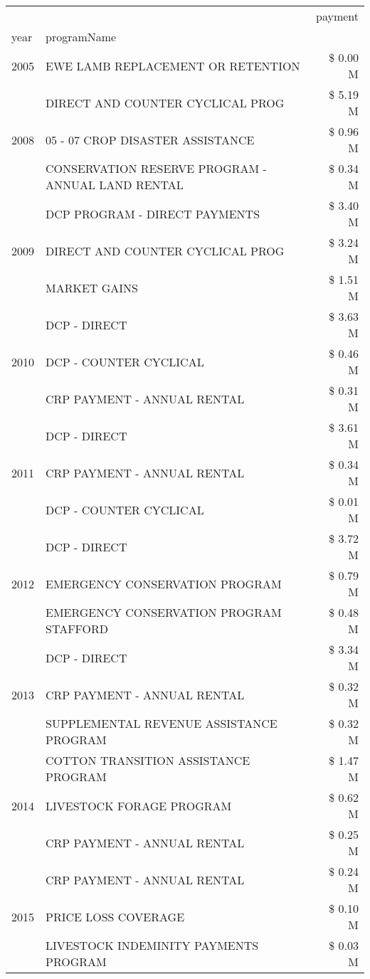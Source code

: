 \begin{tabular}{llr}
\toprule
 &  & payment \\
year & programName &  \\
\midrule
2005 & EWE LAMB REPLACEMENT OR RETENTION & \$ 0.00 M \\
\cline{1-3}
\multirow[t]{3}{*}{2008} & DIRECT AND COUNTER CYCLICAL PROG & \$ 5.19 M \\
 & 05 - 07 CROP DISASTER ASSISTANCE & \$ 0.96 M \\
 & CONSERVATION RESERVE PROGRAM - ANNUAL LAND RENTAL & \$ 0.34 M \\
\cline{1-3}
\multirow[t]{3}{*}{2009} & DCP PROGRAM - DIRECT PAYMENTS & \$ 3.40 M \\
 & DIRECT AND COUNTER CYCLICAL PROG & \$ 3.24 M \\
 & MARKET GAINS & \$ 1.51 M \\
\cline{1-3}
\multirow[t]{3}{*}{2010} & DCP - DIRECT & \$ 3.63 M \\
 & DCP - COUNTER CYCLICAL & \$ 0.46 M \\
 & CRP PAYMENT - ANNUAL RENTAL & \$ 0.31 M \\
\cline{1-3}
\multirow[t]{3}{*}{2011} & DCP - DIRECT & \$ 3.61 M \\
 & CRP PAYMENT - ANNUAL RENTAL & \$ 0.34 M \\
 & DCP - COUNTER CYCLICAL & \$ 0.01 M \\
\cline{1-3}
\multirow[t]{3}{*}{2012} & DCP - DIRECT & \$ 3.72 M \\
 & EMERGENCY CONSERVATION PROGRAM & \$ 0.79 M \\
 & EMERGENCY CONSERVATION PROGRAM STAFFORD & \$ 0.48 M \\
\cline{1-3}
\multirow[t]{3}{*}{2013} & DCP - DIRECT & \$ 3.34 M \\
 & CRP PAYMENT - ANNUAL RENTAL & \$ 0.32 M \\
 & SUPPLEMENTAL REVENUE ASSISTANCE PROGRAM & \$ 0.32 M \\
\cline{1-3}
\multirow[t]{3}{*}{2014} & COTTON TRANSITION ASSISTANCE PROGRAM & \$ 1.47 M \\
 & LIVESTOCK FORAGE PROGRAM & \$ 0.62 M \\
 & CRP PAYMENT - ANNUAL RENTAL & \$ 0.25 M \\
\cline{1-3}
\multirow[t]{3}{*}{2015} & CRP PAYMENT - ANNUAL RENTAL & \$ 0.24 M \\
 & PRICE LOSS COVERAGE & \$ 0.10 M \\
 & LIVESTOCK INDEMINITY PAYMENTS PROGRAM & \$ 0.03 M \\

\end{tabular}
